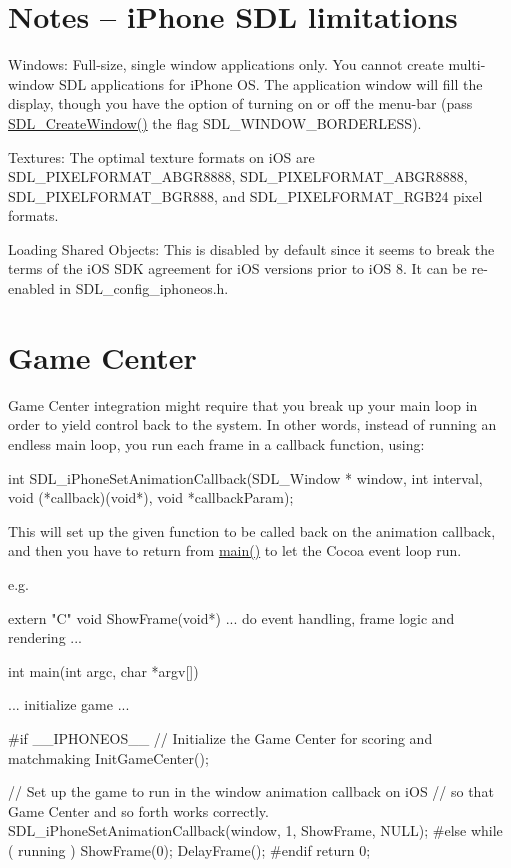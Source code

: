  \section*{Notes -- i\+Phone S\+DL limitations }

Windows\+: Full-\/size, single window applications only. You cannot create multi-\/window S\+DL applications for i\+Phone OS. The application window will fill the display, though you have the option of turning on or off the menu-\/bar (pass \mbox{\hyperlink{_s_d_l__video_8h_a42565088bdb739a5353fd67abbe235d2}{S\+D\+L\+\_\+\+Create\+Window()}} the flag S\+D\+L\+\_\+\+W\+I\+N\+D\+O\+W\+\_\+\+B\+O\+R\+D\+E\+R\+L\+E\+SS).

Textures\+: The optimal texture formats on i\+OS are S\+D\+L\+\_\+\+P\+I\+X\+E\+L\+F\+O\+R\+M\+A\+T\+\_\+\+A\+B\+G\+R8888, S\+D\+L\+\_\+\+P\+I\+X\+E\+L\+F\+O\+R\+M\+A\+T\+\_\+\+A\+B\+G\+R8888, S\+D\+L\+\_\+\+P\+I\+X\+E\+L\+F\+O\+R\+M\+A\+T\+\_\+\+B\+G\+R888, and S\+D\+L\+\_\+\+P\+I\+X\+E\+L\+F\+O\+R\+M\+A\+T\+\_\+\+R\+G\+B24 pixel formats.

Loading Shared Objects\+: This is disabled by default since it seems to break the terms of the i\+OS S\+DK agreement for i\+OS versions prior to i\+OS 8. It can be re-\/enabled in S\+D\+L\+\_\+config\+\_\+iphoneos.\+h. 

 \section*{Game Center }

Game Center integration might require that you break up your main loop in order to yield control back to the system. In other words, instead of running an endless main loop, you run each frame in a callback function, using\+: \begin{DoxyVerb}int SDL_iPhoneSetAnimationCallback(SDL_Window * window, int interval, void (*callback)(void*), void *callbackParam);
\end{DoxyVerb}


This will set up the given function to be called back on the animation callback, and then you have to return from \mbox{\hyperlink{_c_make_c_compiler_id_8c_a0ddf1224851353fc92bfbff6f499fa97}{main()}} to let the Cocoa event loop run.

e.\+g. \begin{DoxyVerb}extern "C"
void ShowFrame(void*)
{
    ... do event handling, frame logic and rendering ...
}

int main(int argc, char *argv[])
{
    ... initialize game ...

#if __IPHONEOS__
    // Initialize the Game Center for scoring and matchmaking
    InitGameCenter();

    // Set up the game to run in the window animation callback on iOS
    // so that Game Center and so forth works correctly.
    SDL_iPhoneSetAnimationCallback(window, 1, ShowFrame, NULL);
#else
    while ( running ) {
        ShowFrame(0);
        DelayFrame();
    }
#endif
    return 0;
}
\end{DoxyVerb}


